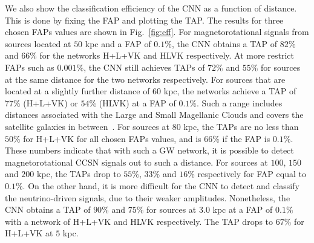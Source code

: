 \documentclass[aps,twocolumn,showpacs,groupedaddress, nofootinbib]{revtex4}  %
\begin{document}
%
%
We also show the classification efficiency of the \ac{CNN}  as a function of
distance.  This is done by fixing the \ac{FAP} and plotting the \ac{TAP}.  The
results for three chosen \acp{FAP} values are shown in Fig.~\ref{fig:eff}.  
For magnetorotational signals from sources located at $50$ kpc and a \ac{FAP}
of $0.1\%$, the \ac{CNN} obtains a \ac{TAP} of $82\%$ and $66\%$ for the
networks H+L+VK and HLVK respectively. At more restrict \acp{FAP} such as
$0.001\%$, the \ac{CNN} still achieves \acp{TAP} of $72\%$ and $55\%$ for sources at
the same distance for the two networks respectively.  For sources that are
located at a slightly further distance of $60$ kpc, the networks achieve a
\ac{TAP} of $77\%$ (H+L+VK) or $54\%$ (HLVK) at a \ac{FAP} of $0.1\%$. Such a range
includes distances associated with the Large and Small Magellanic Clouds and
covers the satellite galaxies in between~\cite{karachentsev2004catalog,
belokurov2007cats}.  For sources at $80$ kpc, the \acp{TAP} are no less than $50\%$ 
for H+L+VK for all chosen \acp{FAP} values, and is $66\%$ if
the \ac{FAP} is $0.1\%$. These numbers indicate that with
such a \ac{GW} network, it is possible to detect magnetorotational \ac{CCSN}
signals out to such a distance. For sources at $100$, $150$ and $200$ kpc, the \acp{TAP}
drop to $55\%$, $33\%$ and $16\%$ respectively for \ac{FAP} equal to $0.1\%$.
On the other hand, it is more difficult for the CNN to detect and classify the
neutrino-driven signals, due to their weaker amplitudes.
Nonetheless, the \ac{CNN} obtains a \ac{TAP} of $90\%$ and $75\%$ for sources 
at $3.0$ kpc at a \ac{FAP} of $0.1\%$ with
a network of H+L+VK and HLVK respectively.
The \ac{TAP} drops to  $67\%$ for H+L+VK at $5$ kpc.
\end{document}
